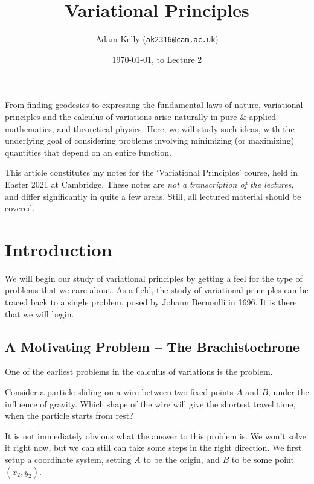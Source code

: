 \documentclass[a4paper]{scrartcl}
\title{Variational Principles}
\author{Adam Kelly (\texttt{ak2316@cam.ac.uk})}
\date{\today, to Lecture 2}
\begin{document}
\maketitle

From finding geodesics to expressing the fundamental laws of nature, variational principles and the calculus of variations arise naturally in pure \& applied mathematics, and theoretical physics.
Here, we will study such ideas, with the underlying goal of considering problems involving minimizing (or maximizing) quantities that depend on an entire function. 

This article constitutes my notes for the `Variational Principles' course, held in Easter 2021 at Cambridge. These notes are \emph{not a transcription of the lectures}, and differ significantly in quite a few areas. Still, all lectured material should be covered.


\tableofcontents

\section{Introduction}



We will begin our study of variational principles by getting a feel for the type of problems that we care about. 
As a field, the study of variational principles can be traced back to a single problem, posed by Johann Bernoulli in 1696. It is there that we will begin.

\subsection{A Motivating Problem -- The Brachistochrone}

One of the earliest problems in the calculus of variations is the  problem.

\begin{example}[Brachistochrone]
	Consider a particle sliding on a wire between two fixed points $A$ and $B$, under the influence of gravity. Which shape of the wire will give the shortest travel time, when the particle starts from rest?
\end{example}

It is not immediately obvious what the answer to this problem is. We won't solve it right now, but we can still can take some steps in the right direction. We first setup a coordinate system, setting $A$ to be the origin, and $B$ to be some point $(x_2, y_2)$.
\end{document}
